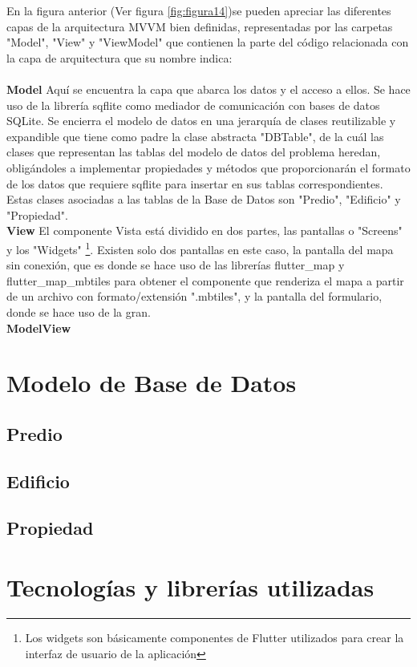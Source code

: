 En la figura anterior (Ver figura \ref{fig:figura14})se pueden apreciar las diferentes capas de la arquitectura MVVM bien definidas,
representadas por las carpetas "Model", "View" y "ViewModel" que contienen la parte del código relacionada con la capa de arquitectura
que su nombre indica:\\\\
\textbf{Model}
Aquí se encuentra la capa que abarca los datos y el acceso a ellos. Se hace uso de la librería sqflite \cite{sqflite} como mediador de comunicación
con bases de datos SQLite. Se encierra el modelo de datos en una jerarquía de clases reutilizable y expandible que tiene como padre la clase abstracta "DBTable",
de la cuál las clases que representan las tablas del modelo de datos del problema heredan, obligándoles a implementar propiedades y métodos que proporcionarán
el formato de los datos que requiere sqflite para insertar en sus tablas correspondientes. Estas clases asociadas a las tablas de la Base de Datos
son "Predio", "Edificio" y "Propiedad".
\\
\textbf{View}
El componente Vista está dividido en dos partes, las pantallas o "Screens" y los "Widgets"
\footnote{Los widgets son básicamente componentes de Flutter utilizados para crear la interfaz de usuario de
    la aplicación}.
Existen solo dos pantallas en este caso, la pantalla del mapa sin conexión, que es donde se hace uso de las librerías flutter\_map y flutter\_map\_mbtiles para
obtener el componente que renderiza el mapa a partir de un archivo con formato/extensión ".mbtiles", y la pantalla del formulario, donde se hace uso de la gran.
\\
\textbf{ModelView}
\\
\section{Modelo de Base de Datos}
\subsection{Predio}
\subsection{Edificio}
\subsection{Propiedad}
\section{Tecnologías y librerías utilizadas}
